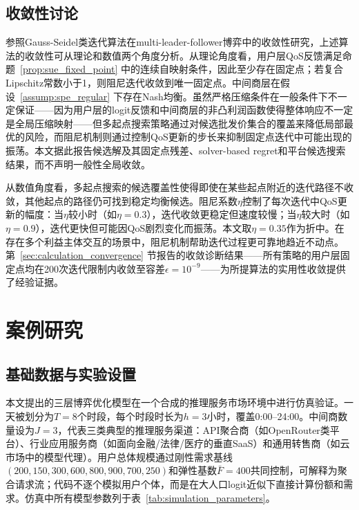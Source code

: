 \documentclass[UTF8,11pt]{ctexart}
\begin{document}
\subsection{收敛性讨论}

参照Gauss-Seidel类迭代算法在multi-leader-follower博弈中的收敛性研究\cite{wang2026hierarchical}，上述算法的收敛性可从理论和数值两个角度分析。从理论角度看，用户层QoS反馈满足命题~\ref{prop:sue_fixed_point} 中的连续自映射条件，因此至少存在固定点；若复合Lipschitz常数小于1，则阻尼迭代收敛到唯一固定点。中间商层在假设~\ref{assump:spe_regular} 下存在Nash均衡。虽然严格压缩条件在一般条件下不一定保证——因为用户层的logit反馈和中间商层的非凸利润函数使得整体响应不一定是全局压缩映射——但多起点搜索策略通过对候选批发价集合的覆盖来降低局部最优的风险，而阻尼机制则通过控制QoS更新的步长来抑制固定点迭代中可能出现的振荡。本文据此报告候选解及其固定点残差、solver-based regret和平台候选搜索结果，而不声明一般性全局收敛。

从数值角度看，多起点搜索的候选覆盖性使得即使在某些起点附近的迭代路径不收敛，其他起点的路径仍可找到稳定均衡候选。阻尼系数$\eta$控制了每次迭代中QoS更新的幅度：当$\eta$较小时（如$\eta=0.3$），迭代收敛更稳定但速度较慢；当$\eta$较大时（如$\eta=0.9$），迭代更快但可能因QoS剧烈变化而振荡。本文取$\eta=0.35$作为折中。在存在多个利益主体交互的场景中，阻尼机制帮助迭代过程更可靠地趋近不动点。第~\ref{sec:calculation_convergence} 节报告的收敛诊断结果——所有策略的用户层固定点均在200次迭代限制内收敛至容差$\epsilon=10^{-9}$——为所提算法的实用性收敛提供了经验证据。

\section{案例研究}
\label{sec:case_study}

\subsection{基础数据与实验设置}
\label{sec:basic_data}

本文提出的三层博弈优化模型在一个合成的推理服务市场环境中进行仿真验证。一天被划分为$T=8$个时段，每个时段时长为$h=3$小时，覆盖0:00--24:00。中间商数量设为$J=3$，代表三类典型的推理服务渠道：API聚合商（如OpenRouter类平台）、行业应用服务商（如面向金融/法律/医疗的垂直SaaS）和通用转售商（如云市场中的模型代理）。用户总体规模通过刚性需求基线$(200,150,300,600,800,900,700,250)$和弹性基数$\bar F=400$共同控制，可解释为聚合请求流；代码不逐个模拟用户个体，而是在大人口logit近似下直接计算份额和需求。仿真中所有模型参数列于表~\ref{tab:simulation_parameters}。
\end{document}
